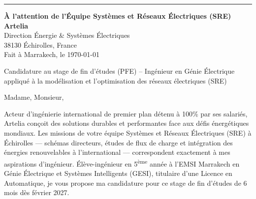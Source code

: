 \documentclass[10pt,a4paper]{altacv}
\makeatletter
\renewcommand{\makecvheader}{%
  \begingroup
    \raggedright\color{emphasis}%
    {\LARGE\bfseries\MakeUppercase{\@name}\par}\vspace{2pt}
    {\normalsize\bfseries\color{accent}\@tagline\par}\vspace{4pt}
    {\footnotesize\color{emphasis}\@personalinfo\par}
  \endgroup\vspace{5pt}
  {\color{heading}\rule{\linewidth}{1.2pt}}\par\vspace{7pt}
}
\makeatother
\begin{document}

\makecvheader

\begin{flushright}
  {\color{emphasis}\textbf{À l'attention de l'Équipe Systèmes et Réseaux Électriques (SRE)}} \\[2pt]
  \textbf{Artelia} \\
  Direction Énergie \& Systèmes Électriques \\
  38130 Échirolles, France \\[6pt]
  Fait à Marrakech, le \today
\end{flushright}
\vspace{4pt}

 Candidature au stage de fin d'études (PFE) -- Ingénieur en Génie Électrique appliqué à la modélisation et l'optimisation des réseaux électriques (SRE)

\vspace{7pt}

\noindent Madame, Monsieur,

\vspace{5pt}

Acteur d'ingénierie international de premier plan détenu à 100\% par ses salariés, Artelia conçoit des solutions durables et performantes face aux défis énergétiques mondiaux. Les missions de votre équipe Systèmes et Réseaux Électriques (SRE) à Échirolles — schémas directeurs, études de flux de charge et intégration des énergies renouvelables à l'international — correspondent exactement à mes aspirations d'ingénieur. Élève-ingénieur en 5\textsuperscript{ème} année à l'EMSI Marrakech en Génie Électrique et Systèmes Intelligents (GESI), titulaire d'une Licence en Automatique, je vous propose ma candidature pour ce stage de fin d'études de 6 mois dès février 2027.
\end{document}
